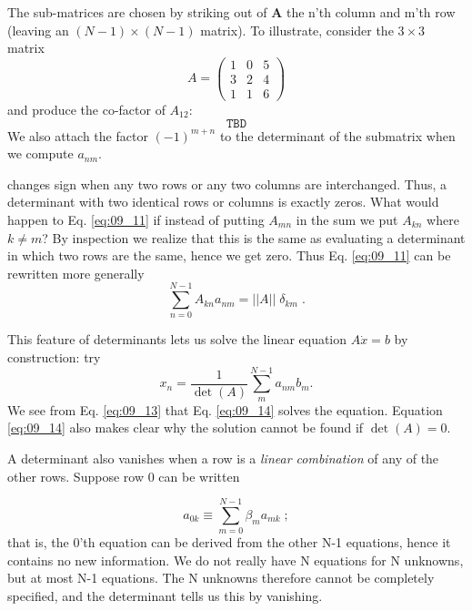 The sub-matrices are chosen by striking out of \textbf{A} the n'th column
and m'th row (leaving an $(N-1)\times(N-1)$ matrix). To illustrate,
consider the $3 \times 3$ matrix
\begin{equation}
    \label{eq:09_11}
    A = 
    \begin{pmatrix}
        1 & 0 & 5\\ 
        3 & 2 & 4\\ 
        1 & 1 & 6
    \end{pmatrix}
\end{equation}
and produce the co-factor of $A_{12}$:
\begin{equation}
    \texttt{TBD}\label{eq:09_12}
\end{equation}
We also attach the factor $(-1)^{m+n}$ to the determinant of the
submatrix when we compute $a_{nm}$.

 changes sign when any two rows or any two 
columns are interchanged. Thus, a determinant with two identical rows or
columns is exactly zeros. What would happen to
Eq. \ref{eq:09_11} if instead of putting $A_{mn}$ in the sum we put $A_{kn}$ where
$k\neq m$? By inspection we realize that this is the same as evaluating
a determinant in which two rows are the same, hence we get zero.
Thus Eq. \ref{eq:09_11} can be rewritten more generally
\begin{equation}
    \sum_{n=0}^{N-1}A_{kn}a_{nm}=||A||\;\delta_{km}\;.\label{eq:09_13}
\end{equation}

This feature of determinants lets us solve the linear equation
$A \dot x = b$ by construction: try
\begin{equation}
    x_n=\frac{1}{\det(A)}\sum_{m}^{N-1}a_{nm}b_m.\label{eq:09_14}
\end{equation}
We see from Eq. \ref{eq:09_13} that Eq. \ref{eq:09_14} solves the equation. Equation \ref{eq:09_14}
also makes clear why the solution cannot be found if $\det(A) = 0$.

A determinant also vanishes when a row is a \textit{linear combination}
of any of the other rows. Suppose row 0 can be written

\begin{equation*}
    a_{0k}\equiv    \sum_{m=0}^{N-1}\beta _m a_{mk}\;;
\end{equation*}
that is, the 0'th equation can be derived from the other N-1
equations, hence it contains no new information. We do not really
have N equations for N unknowns, but at most N-1 equations. The
N unknowns therefore cannot be completely specified, and the
determinant tells us this by vanishing.

